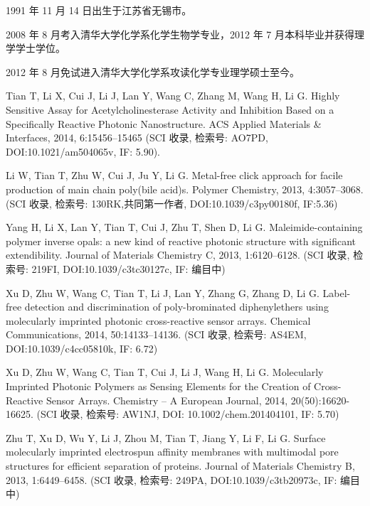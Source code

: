 \begin{resume}


  1991 年 11 月 14 日出生于江苏省无锡市。
  
  2008 年 8 月考入清华大学化学系化学生物学专业，2012 年 7 月本科毕业并获得理学学士学位。
  
  2012 年 8 月免试进入清华大学化学系攻读化学专业理学硕士至今。


  \begin{enumerate}[{[}1{]}]
  
  \item Tian T, Li X, Cui J, Li J, Lan Y, Wang C, Zhang M, Wang H, Li G. Highly Sensitive Assay for Acetylcholinesterase Activity and Inhibition Based on a Specifically Reactive Photonic Nanostructure. ACS Applied Materials \& Interfaces, 2014, 6:15456–15465 (SCI 收录, 检索号: AO7PD, DOI:10.1021/am504065v, IF: 5.90). 
  
  \item Li W, Tian T, Zhu W, Cui J, Ju Y, Li G. Metal-free click approach for facile production of main chain poly(bile acid)s.  Polymer Chemistry, 2013, 4:3057–3068. (SCI 收录, 检索号: 130RK,共同第一作者, DOI:10.1039/c3py00180f, IF:5.36)
  
  \item Yang H, Li X, Lan Y, Tian T, Cui J, Zhu T, Shen D, Li G. Maleimide-containing polymer inverse opals: a new kind of reactive photonic structure with significant extendibility. Journal of Materials Chemistry C, 2013, 1:6120–6128. (SCI 收录, 检索号: 219FI, DOI:10.1039/c3tc30127c, IF: 编目中)
  
  \item Xu D, Zhu W, Wang C, Tian T, Li J, Lan Y, Zhang G, Zhang D, Li G. Label-free detection and discrimination of poly-brominated diphenylethers using molecularly imprinted photonic cross-reactive sensor arrays. Chemical Communications, 2014, 50:14133–14136. (SCI 收录, 检索号: AS4EM, DOI:10.1039/c4cc05810k, IF: 6.72)
  
  \item Xu D, Zhu W, Wang C, Tian T, Cui J, Li J, Wang H, Li G. Molecularly Imprinted Photonic Polymers as Sensing Elements for the Creation of Cross-Reactive Sensor Arrays. Chemistry – A European Journal, 2014, 20(50):16620-16625. (SCI 收录, 检索号: AW1NJ, DOI: 10.1002/chem.201404101, IF: 5.70)
  
  \item Zhu T, Xu D, Wu Y, Li J, Zhou M, Tian T, Jiang Y, Li F, Li G. Surface molecularly imprinted electrospun affinity membranes with multimodal pore structures for efficient separation of proteins.  Journal of Materials Chemistry B, 2013, 1:6449–6458. (SCI 收录, 检索号: 249PA, DOI:10.1039/c3tb20973c, IF: 编目中)
  

\end{enumerate}
\end{resume}

